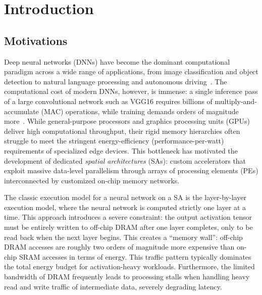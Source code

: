\chapter{Introduction}
\label{ch:introduction}

\section{Motivations}
\label{sec:intro-motivations}
Deep neural networks (DNNs) have become the dominant computational
paradigm across a wide range of applications, from image classification
and object detection to natural language processing and autonomous
driving~\cite{lecun2015deep}.
The computational cost of modern DNNs, however, is immense: a single
inference pass of a large convolutional network such as VGG16 requires
billions of multiply-and-accumulate (MAC) operations, while training
demands orders of magnitude more~\cite{vgg16}.
While general-purpose processors and graphics processing units (GPUs)
deliver high computational throughput, their rigid memory hierarchies
often struggle to meet the stringent energy-efficiency (performance-per-watt)
requirements of specialized edge devices. This bottleneck has motivated the development of dedicated
\emph{spatial architectures} (SAs): custom accelerators that exploit
massive data-level parallelism through arrays of processing elements (PEs)
interconnected by customized on-chip memory networks.


The classic execution model for a neural network on a SA is the layer-by-layer execution model, where the neural network is computed strictly one layer at a time. This approach introduces a severe constraint: the output activation tensor must be entirely written to off-chip DRAM after one layer completes, only to be read back when the next layer begins. This creates a
``memory wall'': off-chip DRAM accesses are roughly two orders of magnitude more expensive than on-chip SRAM accesses in terms of energy. This traffic pattern typically dominates the total energy budget for activation-heavy
workloads. Furthermore, the limited bandwidth of DRAM frequently leads to
processing stalls when handling heavy read and write traffic of intermediate data, severely
degrading latency.

